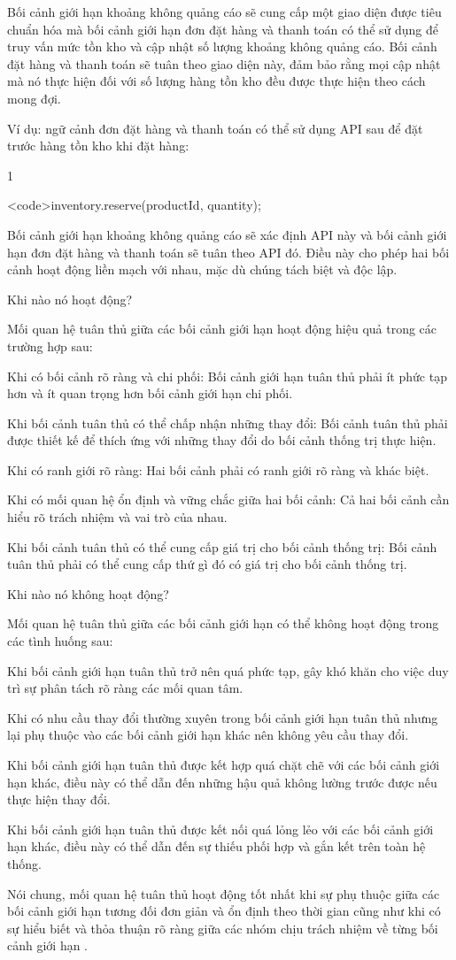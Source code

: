 Bối cảnh giới hạn khoảng không quảng cáo sẽ cung cấp một giao diện được tiêu chuẩn hóa mà bối cảnh giới hạn đơn đặt hàng và thanh toán có thể sử dụng để truy vấn mức tồn kho và cập nhật số lượng khoảng không quảng cáo. Bối cảnh đặt hàng và thanh toán sẽ tuân theo giao diện này, đảm bảo rằng mọi cập nhật mà nó thực hiện đối với số lượng hàng tồn kho đều được thực hiện theo cách mong đợi.

Ví dụ: ngữ cảnh đơn đặt hàng và thanh toán có thể sử dụng API sau để đặt trước hàng tồn kho khi đặt hàng:

1

<code>inventory.reserve(productId, quantity);

Bối cảnh giới hạn khoảng không quảng cáo sẽ xác định API này và bối cảnh giới hạn đơn đặt hàng và thanh toán sẽ tuân theo API đó. Điều này cho phép hai bối cảnh hoạt động liền mạch với nhau, mặc dù chúng tách biệt và độc lập.

Khi nào nó hoạt động?

Mối quan hệ tuân thủ giữa các bối cảnh giới hạn hoạt động hiệu quả trong các trường hợp sau:

Khi có bối cảnh rõ ràng và chi phối: Bối cảnh giới hạn tuân thủ phải ít phức tạp hơn và ít quan trọng hơn bối cảnh giới hạn chi phối.

Khi bối cảnh tuân thủ có thể chấp nhận những thay đổi: Bối cảnh tuân thủ phải được thiết kế để thích ứng với những thay đổi do bối cảnh thống trị thực hiện.

Khi có ranh giới rõ ràng: Hai bối cảnh phải có ranh giới rõ ràng và khác biệt.

Khi có mối quan hệ ổn định và vững chắc giữa hai bối cảnh: Cả hai bối cảnh cần hiểu rõ trách nhiệm và vai trò của nhau.

Khi bối cảnh tuân thủ có thể cung cấp giá trị cho bối cảnh thống trị: Bối cảnh tuân thủ phải có thể cung cấp thứ gì đó có giá trị cho bối cảnh thống trị.

Khi nào nó không hoạt động?

Mối quan hệ tuân thủ giữa các bối cảnh giới hạn có thể không hoạt động trong các tình huống sau:

Khi bối cảnh giới hạn tuân thủ trở nên quá phức tạp, gây khó khăn cho việc duy trì sự phân tách rõ ràng các mối quan tâm.

Khi có nhu cầu thay đổi thường xuyên trong bối cảnh giới hạn tuân thủ nhưng lại phụ thuộc vào các bối cảnh giới hạn khác nên không yêu cầu thay đổi.

Khi bối cảnh giới hạn tuân thủ được kết hợp quá chặt chẽ với các bối cảnh giới hạn khác, điều này có thể dẫn đến những hậu quả không lường trước được nếu thực hiện thay đổi.

Khi bối cảnh giới hạn tuân thủ được kết nối quá lỏng lẻo với các bối cảnh giới hạn khác, điều này có thể dẫn đến sự thiếu phối hợp và gắn kết trên toàn hệ thống.

Nói chung, mối quan hệ tuân thủ hoạt động tốt nhất khi sự phụ thuộc giữa các bối cảnh giới hạn tương đối đơn giản và ổn định theo thời gian cũng như khi có sự hiểu biết và thỏa thuận rõ ràng giữa các nhóm chịu trách nhiệm về từng bối cảnh giới hạn . 